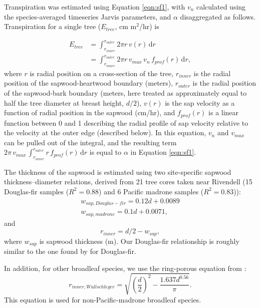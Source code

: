 Transpiration was estimated using Equation \ref{eqn:sf1}, with $v_n$ calculated using the species-averaged timeseries Jarvis parameters, and $\alpha$ disaggregated as follows.  Transpiration for a single tree ($E_{tree}$, cm m$^2$/hr) is

\begin{align}
E_{tree} & = \int_{r_{inner}}^{r_{outer}} 2\pi r \, v(r) \, \mathrm{d}r \nonumber \\ 
& =  \int_{r_{inner}}^{r_{outer}}  2\pi r \, v_{max} \, v_{n} \, f_{prof}(r) \, \mathrm{d}r,
\end{align}
where $r$ is radial position on a cross-section of the tree, $r_{inner}$ is the radial position of the sapwood-heartwood boundary (meters), $r_{outer}$ is the radial position of the sapwood-bark boundary (meters, here treated as approximately equal to half the tree diameter at breast height, $d/2$), $v(r)$ is the sap velocity as a function of radial position in the sapwood (cm/hr), and $f_{prof}(r)$ is a linear function between 0 and 1 describing the radial profile of sap velocity relative to the velocity at the outer edge (described below).  In this equation, $v_n$ and $v_{max}$ can be pulled out of the integral, and the resulting term $2\pi \, v_{max} \, \int_{r_{inner}}^{r_{outer}}  r \, f_{prof}(r) \, \mathrm{d}r$ is equal to $\alpha$ in Equation \ref{eqn:sf1}.

The thickness of the sapwood is estimated using two site-specific sapwood thickness--diameter relations, derived from 21 tree cores taken near Rivendell (15 Douglas-fir samples ($R^2=0.88$) and 6 Pacific madrone samples ($R^2=0.83$)):
\begin{align}
\label{eqn:sapwood}
w_{sap,Douglas-fir} = 0.12d+0.0089\\
w_{sap,madrone} = 0.1d+0.0071 ,
\end{align}
and
\begin{equation}
r_{inner} = d/2-w_{sap},
\end{equation}
where $w_{sap}$ is sapwood thickness (m).  Our Douglas-fir relationship is roughly similar to the one found by \cite{smith1966variation} for Douglas-fir.  

In addition, for other broadleaf species, we use the ring-porous equation from \cite{wullschleger2001transpiration}:
\begin{equation}
\label{eqn:sapwood2}
r_{inner,Wullschleger} = \sqrt{\left(\frac{d}{2}\right)^2-\frac{1.637d^{0.56}}{\pi}}.
\end{equation}
This equation is used for non-Pacific-madrone broadleaf species.


